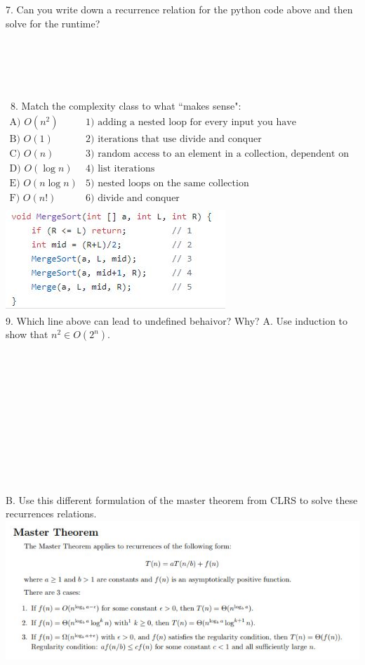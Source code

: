 \documentclass[12pt]{article}
\begin{document}
7. Can you write down a recurrence relation for the python code above and then solve for the runtime?\\\\\\\\\\\\\
8. Match the complexity class to what ``makes sense":
\[
\begin{array}{cc}
 \text{A) $O(n^2)$} & \text{1) adding a nested loop for every input you have} \\
 \text{B) $O(1)$} & \text{2) iterations that use divide and conquer} \\
 \text{C) $O(n)$} & \text{3) random access to an element in a collection, dependent on indexing} \\
 \text{D) $O(\log{n})$} & \text{4) list iterations} \\
 \text{E) $O(n\log{n})$} & \text{5) nested loops on the same collection} \\
 \text{F) $O(n!)$} & \text{6) divide and conquer} \\
\end{array}
\]
\includegraphics{msort.JPG}\\
9. Which line above can lead to undefined behaivor? Why?
\newpage
\noindent A. Use induction to show that $n^2\in O(2^n)$.\\\\\\\\\\\\\\\\\\\\\\\\
\noindent B. Use this different formulation of the master theorem from CLRS to solve these recurrences relations.
\\\includegraphics[width=\linewidth]{mastertheorem.JPG}
\end{document}
